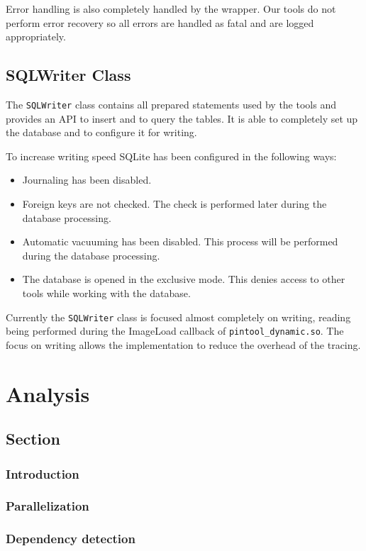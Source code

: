 Error handling is also completely handled by the wrapper. Our tools do not perform error recovery so all errors are handled as fatal and are logged appropriately. 

\subsection{SQLWriter Class}
\label{sqlwriter}

The \texttt{SQLWriter} class contains all prepared statements used by the tools and provides an API to insert and to query the tables. It is able to completely set up the database and to configure it for writing.

To increase writing speed SQLite has been configured in the following ways:

\begin{itemize}
	\item Journaling has been disabled.
	\item Foreign keys are not checked. The check is performed later during the database processing.
	\item Automatic vacuuming has been disabled. This process will be performed during the database processing.
	\item The database is opened in the exclusive mode. This denies access to other tools while working with the database.
\end{itemize}

Currently the \texttt{SQLWriter} class is focused almost completely on writing, reading being performed during the ImageLoad callback of \texttt{pintool\_dynamic.so}. The focus on writing allows the implementation to reduce the overhead of the tracing.

\section{Analysis}

\subsection{Section}
\subsubsection{Introduction}
\subsubsection{Parallelization}
\subsubsection{Dependency detection}
